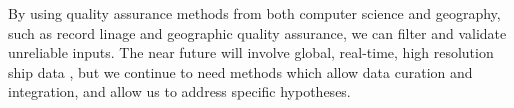 By using quality assurance methods from both computer science and geography, such as record linage and geographic quality assurance, we can filter and validate unreliable inputs. The near future will involve global, real-time, high resolution ship data \citep{JonesGoogle2012,carson2012satellite}, but we continue to need methods which allow data curation and integration,  and allow us to address specific hypotheses.


